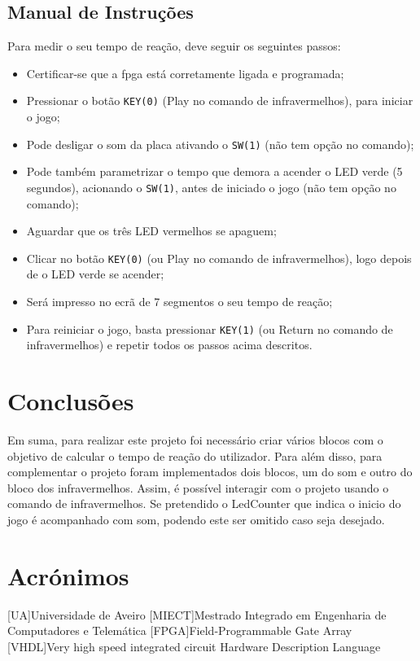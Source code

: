 \documentclass[a4paper,11pt,onecolumn]{report}
\begin{document}
\section{Manual de Instruções}
Para medir o seu tempo de reação, deve seguir os seguintes passos:
\begin{itemize}
\item Certificar-se que a \ac{fpga} está corretamente ligada e programada;
\item Pressionar o botão \texttt{KEY(0)} (Play no comando de infravermelhos), para iniciar o jogo;
\item Pode desligar o som da placa ativando o \texttt{SW(1)} (não tem opção no comando);
\item Pode também parametrizar o tempo que demora a acender o LED verde (5 segundos), acionando o \texttt{SW(1)}, antes de iniciado o jogo (não tem opção no comando);
\item Aguardar que os três LED vermelhos se apaguem;
\item Clicar no botão \texttt{KEY(0)} (ou Play no comando de infravermelhos), logo depois de o LED verde se acender;
\item Será impresso no ecrã de 7 segmentos o seu tempo de reação;
\item Para reiniciar o jogo, basta pressionar \texttt{KEY(1)} (ou Return no comando de infravermelhos) e repetir todos os passos acima descritos.
\end{itemize}


\chapter{Conclusões}
\label{chap.conclusao}
Em suma, para realizar este projeto foi necessário criar vários blocos com o objetivo de calcular o tempo de reação do utilizador. Para além disso, para complementar o projeto foram implementados dois blocos, um do som e outro do bloco dos infravermelhos. Assim, é possível interagir com o projeto usando o comando de infravermelhos. Se pretendido o LedCounter que indica o inicio do jogo é acompanhado com som, podendo este ser omitido caso seja desejado. 


\chapter*{Acrónimos}
\begin{acronym}
[UA]{Universidade de Aveiro}
[MIECT]{Mestrado Integrado em Engenharia de Computadores e Telemática}
[FPGA]{Field-Programmable Gate Array}
[VHDL]{Very high speed integrated circuit Hardware Description Language}

\end{acronym}


\end{document}
